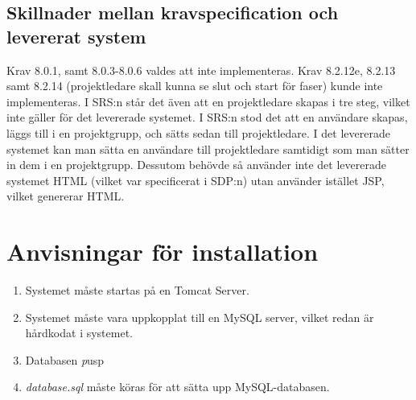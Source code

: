 \documentclass[paper=a4, fontsize=11pt,twoside]{article}
\begin{document}
\subsection{Skillnader mellan kravspecification och levererat system}
Krav 8.0.1, samt 8.0.3-8.0.6 valdes att inte implementeras. %
\flushleft
Krav 8.2.12e, 8.2.13 samt 8.2.14 (projektledare skall kunna se slut och start
för faser) kunde inte implementeras. I SRS:n står det även att en projektledare skapas i tre steg, vilket inte gäller för det levererade systemet. I SRS:n stod det att en användare skapas, läggs till i en projektgrupp, och sätts sedan till projektledare. I det levererade systemet kan man sätta en användare till projektledare samtidigt som man sätter in dem i en projektgrupp. Dessutom behövde så använder inte det levererade systemet HTML (vilket var specificerat i SDP:n) utan använder istället JSP, vilket genererar HTML.

\newpage
\section{Anvisningar för installation}
\begin{enumerate}
\item Systemet måste startas på en Tomcat Server.
\item Systemet måste vara uppkopplat till en MySQL server, vilket redan är
hårdkodat i systemet.
\item Databasen \textit pusp
\item \textit{database.sql} måste köras för att sätta upp MySQL-databasen.
\end{enumerate}
\end{document}
